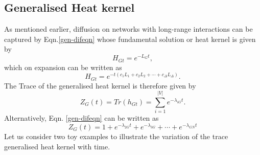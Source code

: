 \documentclass[10pt,a4paper]{article}
\begin{document}
        \subsection{Generalised Heat kernel}
        As mentioned earlier, diffusion on networks with long-range interactions can be captured by Eqn.\ref{gen-difeqn} whose fundamental solution or heat kernel is given by 
        \begin{equation}
        H_{Gt} = e^{-L_{G}t},
        \end{equation}
        which on expansion can be written as 
        \begin{equation}
        H_{Gt} = e^{-t(c_{1}L_{1} + c_{2}L_{2} + \cdots + c_{\Delta}L_{\Delta})}.
        \end{equation}
        The Trace of the generalised heat kernel is therefore given by
        \begin{equation}
        Z_{G}(t) = Tr(h_{Gt}) = \sum_{i=1}^{|V|} e^{-\lambda_{iG} t}.
        \label{Genkerneltrace}
        \end{equation}
        Alternatively, Eqn. \ref{gen-difeqn} can be written as 
        \begin{equation}
        Z_{G}(t) =  1+ e^{-\lambda_{2G} t} + e^{-\lambda_{3G}} + \cdots + e^{-\lambda_{GN} t}
        \end{equation}
        Let us consider two toy examples to illustrate the variation of the trace generalised heat kernel with time.
\end{document}
